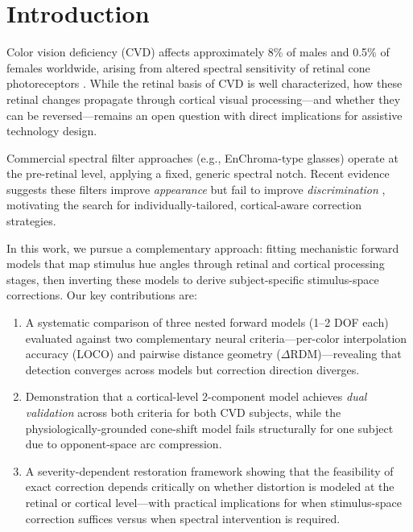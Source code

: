 \documentclass{article}
\begin{document}
\section{Introduction}
\label{sec:intro}

Color vision deficiency (CVD) affects approximately 8\% of males and 0.5\% of females worldwide, arising from altered spectral sensitivity of retinal cone photoreceptors \cite{placeholder_machado2009}.
While the retinal basis of CVD is well characterized, how these retinal changes propagate through cortical visual processing---and whether they can be reversed---remains an open question with direct implications for assistive technology design.

Commercial spectral filter approaches (e.g., EnChroma-type glasses) operate at the pre-retinal level, applying a fixed, generic spectral notch.
Recent evidence suggests these filters improve \emph{appearance} but fail to improve \emph{discrimination} \cite{placeholder_somers2024}, motivating the search for individually-tailored, cortical-aware correction strategies.

In this work, we pursue a complementary approach: fitting mechanistic forward models that map stimulus hue angles through retinal and cortical processing stages, then inverting these models to derive subject-specific stimulus-space corrections.
Our key contributions are:
\begin{enumerate}
    \item A systematic comparison of three nested forward models (1--2 DOF each) evaluated against two complementary neural criteria---per-color interpolation accuracy (LOCO) and pairwise distance geometry ($\Delta$RDM)---revealing that detection converges across models but correction direction diverges.
    \item Demonstration that a cortical-level 2-component model achieves \emph{dual validation} across both criteria for both CVD subjects, while the physiologically-grounded cone-shift model fails structurally for one subject due to opponent-space arc compression.
    \item A severity-dependent restoration framework showing that the feasibility of exact correction depends critically on whether distortion is modeled at the retinal or cortical level---with practical implications for when stimulus-space correction suffices versus when spectral intervention is required.
\end{enumerate}
\end{document}
